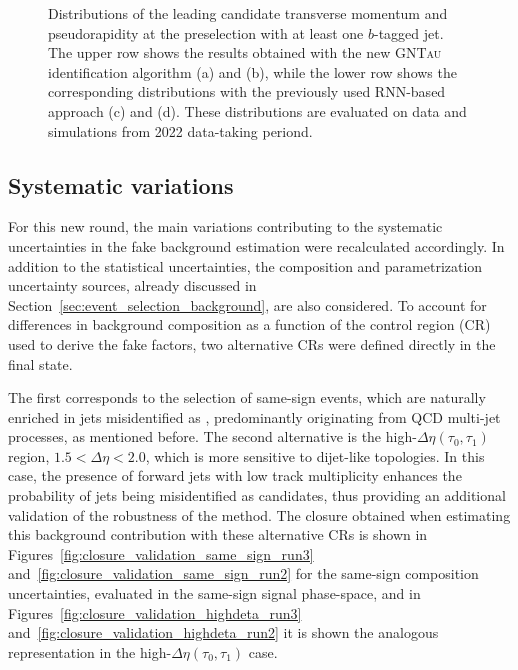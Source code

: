 \begin{figure}[htbp]
    \caption{Distributions of the leading \tauhad candidate transverse momentum and pseudorapidity at the \ttH preselection with at least one $b$-tagged jet. 
    The upper row shows the results obtained with the new \textsc{GNTau} identification algorithm (a) and (b), while the lower row shows the corresponding distributions with the previously used RNN-based approach (c) and (d). These distributions are evaluated on data and simulations from 2022 data-taking periond.}
    \label{run2_fakes_comparison}
\end{figure}

\subsection{Systematic variations}

For this new round, the main variations contributing to the systematic uncertainties in the fake background estimation were recalculated accordingly. In addition to the statistical uncertainties, the composition and parametrization uncertainty sources, already discussed in Section~\ref{sec:event_selection_background}, are also considered.  
To account for differences in background composition as a function of the control region (CR) used to derive the fake factors, two alternative CRs were defined directly in the \tauhadhad final state.  

The first corresponds to the selection of same-sign events, which are naturally enriched in jets misidentified as \tauhad, predominantly originating from QCD multi-jet processes, as mentioned before.
The second alternative is the high-$\Delta\eta(\tau_0,\tau_1)$ region, $1.5 < \Delta\eta < 2.0$, which is more sensitive to dijet-like topologies. In this case, the presence of forward jets with low track multiplicity enhances the probability of jets being misidentified as \tauhad candidates, thus providing an additional validation of the robustness of the method. The closure obtained when estimating this background contribution with these alternative CRs is shown in Figures~\ref{fig:closure_validation_same_sign_run3} and~\ref{fig:closure_validation_same_sign_run2} for the same-sign composition uncertainties, evaluated in the same-sign \tauhadhad signal phase-space, and in Figures~\ref{fig:closure_validation_highdeta_run3} and~\ref{fig:closure_validation_highdeta_run2} it is shown the analogous representation in the high-$\Delta \eta (\tau_0,\tau_1)$ case.

